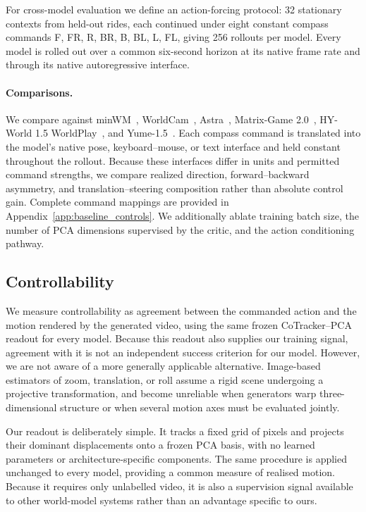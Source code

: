 \documentclass[letterpaper]{article} %
\begin{document}
For cross-model evaluation we define an action-forcing protocol: 32 stationary contexts from held-out rides, each continued under eight constant compass commands {F, FR, R, BR, B, BL, L, FL}, giving 256 rollouts per model. Every model is rolled out over a common six-second horizon at its native frame rate and through its native autoregressive interface.

\paragraph{Comparisons.}
We compare against minWM~\cite{minwm}, WorldCam~\cite{worldcam},
Astra~\cite{astra}, Matrix-Game 2.0~\cite{matrixgame2},
HY-World 1.5 WorldPlay~\cite{hyworldplay}, and
Yume-1.5~\cite{yume}. Each compass command is translated into the model's native pose, keyboard–mouse, or text interface and held constant throughout the rollout. Because these interfaces differ in units and permitted command
strengths, we compare realized direction, forward--backward asymmetry, and
translation--steering composition rather than absolute control gain.
Complete command mappings are provided in
Appendix~\ref{app:baseline_controls}. We additionally ablate training batch
size, the number of PCA dimensions supervised by the critic, and the action
conditioning pathway.

\subsection{Controllability}

We measure controllability as agreement between the commanded action and the
motion rendered by the generated video, using the same frozen
CoTracker--PCA readout for every model. Because this readout also supplies our training signal, agreement with
it is not an independent success criterion for our model. However, we are not
aware of a more generally applicable alternative. Image-based estimators of
zoom, translation, or roll assume a rigid scene undergoing a projective
transformation, and become unreliable when generators warp three-dimensional
structure or when several motion axes must be evaluated jointly.

Our readout is deliberately simple. It tracks a fixed grid of pixels and
projects their dominant displacements onto a frozen PCA basis, with no learned
parameters or architecture-specific components. The same procedure is applied
unchanged to every model, providing a common measure of realised motion.
Because it requires only unlabelled video, it is also a supervision signal
available to other world-model systems rather than an advantage specific to
ours.
\end{document}
